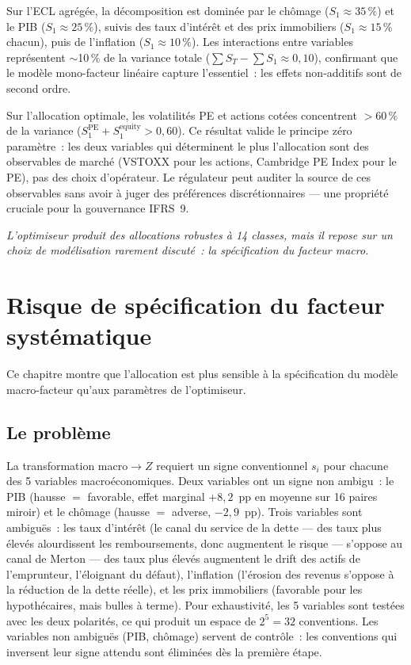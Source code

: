 \documentclass[10pt, a4paper, oneside]{report}
\theoremstyle{definition}
\begin{document}
Sur l'ECL agrégée, la décomposition est dominée par le chômage ($S_1 \approx 35\,\%$) et le PIB ($S_1 \approx 25\,\%$), suivis des taux d'intérêt et des prix immobiliers ($S_1 \approx 15\,\%$ chacun), puis de l'inflation ($S_1 \approx 10\,\%$). Les interactions entre variables représentent $\sim$10\,\% de la variance totale ($\sum S_T - \sum S_1 \approx 0{,}10$), confirmant que le modèle mono-facteur linéaire capture l'essentiel~: les effets non-additifs sont de second ordre.

Sur l'allocation optimale, les volatilités PE et actions cotées concentrent $> 60\,\%$ de la variance ($S_1^{\text{PE}} + S_1^{\text{equity}} > 0{,}60$). Ce résultat valide le principe zéro paramètre~: les deux variables qui déterminent le plus l'allocation sont des observables de marché (VSTOXX pour les actions, Cambridge PE Index pour le PE), pas des choix d'opérateur. Le régulateur peut auditer la source de ces observables sans avoir à juger des préférences discrétionnaires --- une propriété cruciale pour la gouvernance IFRS~9.


\bigskip\noindent\textit{L'optimiseur produit des allocations robustes à 14 classes, mais il repose sur un choix de modélisation rarement discuté~: la spécification du facteur macro.}



\chapter{Risque de spécification du facteur systématique}
\label{chap:conventions}

Ce chapitre montre que l'allocation est plus sensible à la spécification du modèle macro-facteur qu'aux paramètres de l'optimiseur.


\section{Le problème}
\label{sec:ch5:probleme}

La transformation macro$\to Z$ requiert un signe conventionnel $s_i$ pour chacune des 5 variables macroéconomiques. Deux variables ont un signe non ambigu~: le PIB (hausse $=$ favorable, effet marginal $+8{,}2$~pp en moyenne sur 16 paires miroir) et le chômage (hausse $=$ adverse, $-2{,}9$~pp). Trois variables sont ambiguës~: les taux d'intérêt (le canal du service de la dette --- des taux plus élevés alourdissent les remboursements, donc augmentent le risque --- s'oppose au canal de Merton --- des taux plus élevés augmentent le drift des actifs de l'emprunteur, l'éloignant du défaut), l'inflation (l'érosion des revenus s'oppose à la réduction de la dette réelle), et les prix immobiliers (favorable pour les hypothécaires, mais bulles à terme). Pour exhaustivité, les 5 variables sont testées avec les deux polarités, ce qui produit un espace de $2^5 = 32$ conventions. Les variables non ambiguës (PIB, chômage) servent de contrôle~: les conventions qui inversent leur signe attendu sont éliminées dès la première étape.
\end{document}
